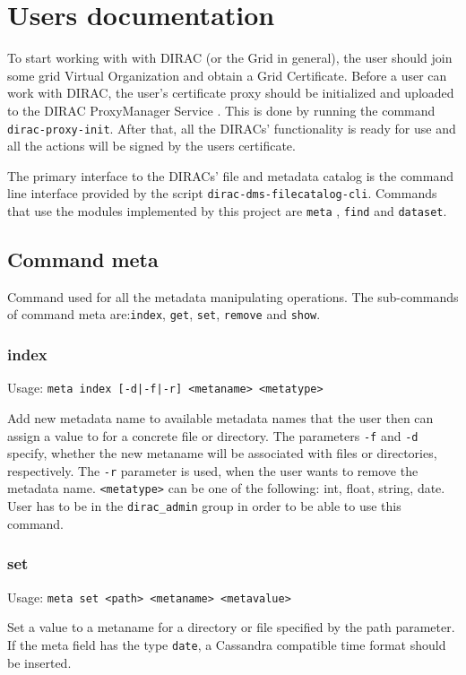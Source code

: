 \chapter{Users documentation}
\label{chap:user}

To start working with with DIRAC 
(or the Grid in general), the user should join some 
grid Virtual Organization and obtain a Grid Certificate. 
Before a user can work with DIRAC, the user’s certificate proxy 
should be initialized and uploaded to the DIRAC ProxyManager Service \cite{DISET}.
This is done by running the command \texttt{dirac-proxy-init}. After that,
all the DIRACs' functionality is ready for use and all the actions will
be signed by the users certificate.

The primary interface to the DIRACs' file and metadata catalog
is the command line interface provided by the script
\texttt{dirac-dms-filecatalog-cli}. Commands that use the modules 
implemented by this project are \texttt{meta} , \texttt{find} 
and \texttt{dataset}.

\section{Command meta}
Command used for all the metadata manipulating operations.
The sub-commands of command meta are:\texttt{index}, \texttt{get},
\texttt{set}, \texttt{remove} and \texttt{show}.

\subsection{index}
Usage: \texttt{meta index [-d|-f|-r] <metaname> <metatype>}

Add new metadata name to available metadata names
that the user then can assign a value to for a concrete file
or directory. The parameters \texttt{-f} and \texttt{-d} specify,
whether the new metaname will be associated with files or directories,
respectively. The \texttt{-r} parameter is used, when the user
wants to remove the metadata name. \texttt{<metatype>} can be
one of the following: int, float, string, date. User has to be
in the \texttt{dirac\_admin} group in order to be able to use this
command.

\subsection{set}
Usage: \texttt{meta set <path> <metaname> <metavalue>}

Set a value to a metaname for a directory or file specified by
the path parameter. If the meta field has the type \texttt{date},
a Cassandra compatible time format should be inserted.


